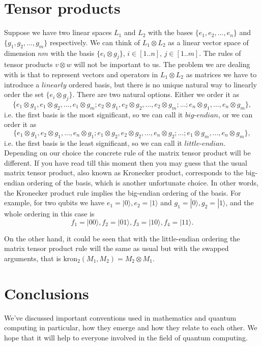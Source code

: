 \documentclass{article}
\begin{document}
\section{Tensor products}

Suppose we have two linear spaces $L_1$ and $L_2$ with the bases $\{e_1, e_2, ... , e_n\}$ and $\{g_1, g_2, ... , g_m\}$ respectively.
We can think of $L_1 \otimes L_2$ as a linear vector space of dimension $nm$ with 
the basis $\{ e_i \otimes g_j \}$, $i \in [1..n]$, $j \in [1..m]$. 
The rules of tensor products $v \otimes w$ will not be important to us. 
The problem we are dealing with is that to represent vectors and operators in $L_1 \otimes L_2$ as matrices 
we have to introduce a $\textit{linearly}$ ordered basis, 
but there is no unique natural way to linearly order the set $\{ e_i \otimes g_j \}$. 
There are two natural options. 
Either we order it as 
$$\{ e_1 \otimes g_1, e_1 \otimes g_2, ..., e_1 \otimes g_m; e_2 \otimes g_1, e_2 \otimes g_2, ..., e_2 \otimes g_m; ... ; e_n \otimes g_1, ..., e_n \otimes g_m  \},$$ 
i.e. the first basis is the most significant, so we can call it $\textit{big-endian}$, 
or we can order it as 
$$\{ e_1 \otimes g_1, e_2 \otimes g_1, ..., e_n \otimes g_1; e_1 \otimes g_2, e_2 \otimes g_2, ..., e_n \otimes g_2; ... ; e_1 \otimes g_m, ..., e_n \otimes g_m  \},$$
i.e. the first basis is the least significant, so we can call it $\textit{little-endian}$. 
Depending on our choice the concrete rule of the matrix tensor product will be different. 
If you have read till this moment then you may guess that the usual matrix tensor product, also known as Kronecker product, 
corresponds to the big-endian ordering of the basis, which is another unfortunate choice. 
In other words, the Kronecker product rule implies the big-endian ordering of the basis. 
For example, for two qubits we have $e_1 = |0\rangle, e_2 = |1\rangle$ and $g_1 = |0\rangle, g_2 = |1\rangle$, 
and the whole ordering in this case is 
$$ f_1 = |00\rangle, f_2 = |01\rangle, f_3 = |10\rangle, f_4 = |11\rangle.$$

On the other hand, it could be seen that with the little-endian ordering the matrix tensor product rule will the same as usual but with the swapped arguments, 
that is $\textrm{kron}_2(M_1, M_2) = M_2 \otimes M_1$.



\section{Conclusions}
We've discussed important conventions used in mathematics and quantum computing in particular, 
how they emerge and how they relate to each other. 
We hope that it will help to everyone involved in the field of quantum computing. 


% 
\end{document}
